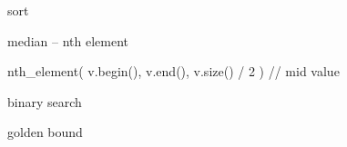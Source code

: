 \categorycontents{}

\begin{algorithm}{sort}
\end{algorithm}

\begin{algorithm}{median -- nth element}
  \begin{example}
	nth_element( v.begin(), v.end(), v.size() / 2 ) // mid value
  \end{example}
\end{algorithm}
\begin{algorithm}{binary search}
\end{algorithm}
\begin{algorithm}{golden bound}
\end{algorithm}

\begin{sourceslandscape}
\end{sourceslandscape}
